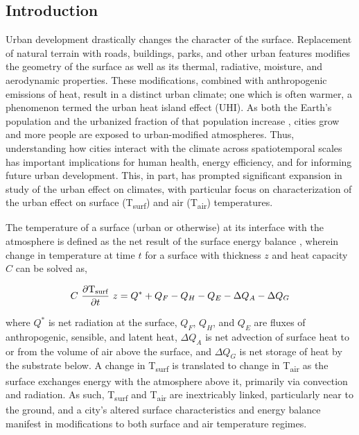\begin{bibunit}
	
\rhead{\thepage}

\chapter{Introduction}
Urban development drastically changes the character of the surface. Replacement of natural terrain with roads, buildings, parks, and other urban features modifies the geometry of the surface as well as its thermal, radiative, moisture, and aerodynamic properties. These modifications, combined with anthropogenic emissions of heat, result in a distinct urban climate; one which is often warmer, a phenomenon termed the urban heat island effect (UHI). As both the Earth's population and the urbanized fraction of that population increase \citep{Nations2014}, cities grow and more people are exposed to urban-modified atmospheres. Thus, understanding how cities interact with the climate across spatiotemporal scales has important implications for human health, energy efficiency, and for informing future urban development. This, in part, has prompted significant expansion in study of the urban effect on climates, with particular focus on characterization of the urban effect on surface (T\textsubscript{surf}) and air (T\textsubscript{air}) temperatures.

\pagebreak

The temperature of a surface (urban or otherwise) at its interface with the atmosphere is defined as the net result of the surface energy balance \citep{Oke2017}, wherein change in temperature at time $t$ for a surface with thickness $z$ and heat capacity $C$ can be solved as,

\begin{equation}
	C~\frac{\partial \text{T\textsubscript{surf}}}{\partial t}~z = Q^*+ Q_F - Q_H - Q_E - \Delta Q_A - \Delta Q_G
\end{equation}

\noindent where $Q^*$ is net radiation at the surface, $Q_F$, $Q_H$, and $Q_E$ are fluxes of anthropogenic, sensible, and latent heat, $\Delta Q_A$ is net advection of surface heat to or from the volume of air above the surface, and $\Delta Q_G$ is net storage of heat by the substrate below. A change in T\textsubscript{surf} is translated to change in T\textsubscript{air} as the surface exchanges energy with the atmosphere above it, primarily via convection and radiation. As such, T\textsubscript{surf} and T\textsubscript{air} are inextricably linked, particularly near to the ground, and a city's altered surface characteristics and energy balance manifest in modifications to both surface and air temperature regimes.


\end{bibunit}
